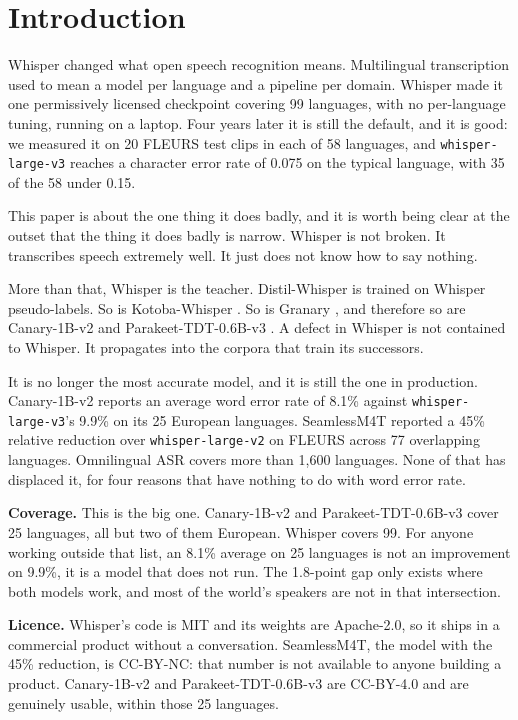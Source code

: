 \documentclass[preprint]{article}
\begin{document}
\section{Introduction}

Whisper \citep{radford2022whisper} changed what open speech recognition means. Multilingual
transcription used to mean a model per language and a pipeline per domain. Whisper made it one permissively licensed
checkpoint covering 99 languages, with no per-language tuning, running on a laptop. Four years later it is still the default, and it is good: we measured it on 20 FLEURS
\citep{conneau2022fleurs} test clips in each of 58 languages, and
\texttt{whisper-large-v3} reaches a character error rate of 0.075 on the typical language,
with 35 of the 58 under 0.15.

This paper is about the one thing it does badly, and it is worth being clear at the outset
that the thing it does badly is narrow. Whisper is not broken. It transcribes speech extremely
well. It just does not know how to say nothing.

More than that, Whisper is the teacher. Distil-Whisper \citep{gandhi2023distilwhisper} is
trained on Whisper pseudo-labels. So is Kotoba-Whisper \citep{kotobawhisper2024}. So is
Granary \citep{koluguri2025granary}, and therefore so are Canary-1B-v2 and
Parakeet-TDT-0.6B-v3 \citep{sekoyan2025canaryv2}. A defect in Whisper is not contained to
Whisper. It propagates into the corpora that train its successors.

It is no longer the most accurate model, and it is still the one in production. Canary-1B-v2
reports an average word error rate of 8.1\% against \texttt{whisper-large-v3}'s 9.9\% on its
25 European languages. SeamlessM4T \citep{seamless2023m4t} reported a 45\% relative reduction
over \texttt{whisper-large-v2} on FLEURS across 77 overlapping languages. Omnilingual ASR
\citep{keren2025omnilingual} covers more than 1,600 languages. None of that has displaced it,
for four reasons that have nothing to do with word error rate.

\textbf{Coverage.} This is the big one. Canary-1B-v2 and Parakeet-TDT-0.6B-v3 cover 25
languages, all but two of them European. Whisper covers 99. For anyone working outside that
list, an 8.1\% average on 25 languages is not an improvement on 9.9\%, it is a model that
does not run. The 1.8-point gap only exists where both models work, and most of the world's
speakers are not in that intersection.

\textbf{Licence.} Whisper's code is MIT and its weights are Apache-2.0, so it ships in a
commercial product without a conversation. SeamlessM4T, the model with the 45\% reduction, is
CC-BY-NC: that number is not available to anyone building a product. Canary-1B-v2 and
Parakeet-TDT-0.6B-v3 are CC-BY-4.0 and are genuinely usable, within those 25 languages.
\end{document}
